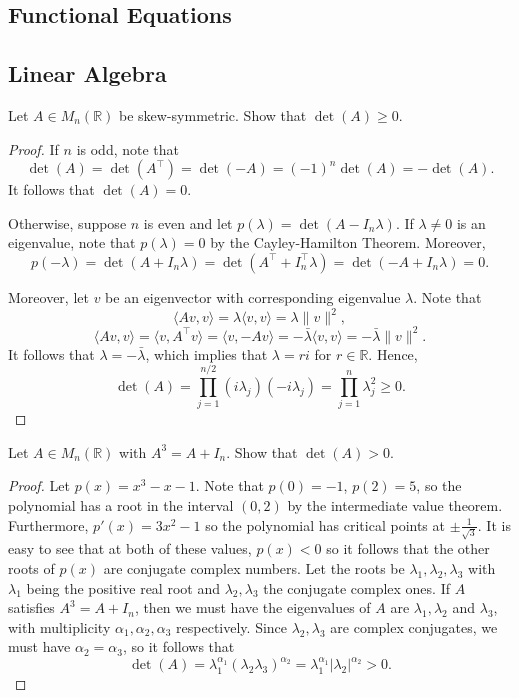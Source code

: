 \documentclass[11pt]{article}
\newcommand{\R}{\mathbb{R}}
\renewcommand{\>}{\rangle}
\newcommand{\<}{\langle}
\begin{document}
\subsection{Functional Equations}
\subsection{Linear Algebra}
\begin{problem} Let $A \in M_n(\R)$ be skew-symmetric. Show that $\det(A) \ge 0$.
\end{problem}
\begin{proof}
If $n$ is odd, note that
 $$\det(A) = \det(A^\intercal) = \det(-A) = (-1)^n \det(A) = -\det(A).$$
 It follows that $\det(A) = 0$.

Otherwise, suppose $n$ is even and let $p(\lambda) = \det(A - I_n \lambda)$.  If $\lambda \ne 0$ is an eigenvalue, note that $p(\lambda) = 0$ by the Cayley-Hamilton Theorem.  Moreover,
$$p(-\lambda) = \det(A + I_n \lambda) = \det(A^\intercal + I_n^\intercal \lambda) = \det(-A + I_n \lambda) = 0.$$

Moreover, let $v$ be an eigenvector with corresponding eigenvalue $\lambda$.   Note that 
$$\<Av, v\> = \lambda\<v, v\> = \lambda \|v\|^2,$$
$$\<Av, v\> = \<v, A^\intercal v\> = \<v, -Av\> = -\bar{\lambda} \<v, v\> = -\bar{\lambda} \|v\|^2.$$
It follows that $\lambda = -\bar{\lambda}$, which implies that $\lambda = r i$ for $r \in \R$.  Hence,
$$\det(A) = \prod_{j=1}^{n/2} (i \lambda_j)(-i \lambda_j) = \prod_{j=1}^n \lambda_j^2 \ge 0.$$ 
\end{proof}

\begin{problem} Let $A \in M_n(\R)$ with $A^3 = A + I_n$.  Show that $\det(A) > 0$.
\end{problem}
\begin{proof}
Let $p(x) = x^3 - x - 1$.  Note that $p(0) = -1$, $p(2) = 5$, so the polynomial has a root in the interval $(0, 2)$ by the intermediate value theorem.  Furthermore, $p'(x) = 3x^2 - 1$ so the polynomial has critical points at $\pm\frac{1}{\sqrt{3}}$.  It is easy to see that at both of these values, $p(x) < 0$ so it follows that the other roots of $p(x)$ are conjugate complex numbers.  Let the roots be $\lambda_1, \lambda_2, \lambda_3$ with $\lambda_1$ being the positive real root and $\lambda_2, \lambda_3$ the conjugate complex ones.  If $A$ satisfies $A^3 = A + I_n$, then we must have the eigenvalues of $A$ are $\lambda_1, \lambda_2$ and $\lambda_3$, with multiplicity $\alpha_1, \alpha_2, \alpha_3$ respectively.  Since $\lambda_2, \lambda_3$ are complex conjugates, we must have $\alpha_2 = \alpha_3$, so it follows that 
$$\det(A) = \lambda_1^{\alpha_1} (\lambda_2 \lambda_3)^{\alpha_2} = \lambda_1^{\alpha_1} |\lambda_2|^{\alpha_2} > 0.$$
\end{proof}
\end{document}
